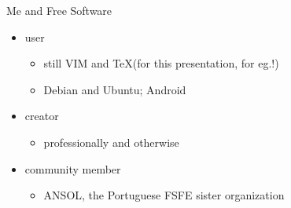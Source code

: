 \documentclass[landscape]{slides}
\begin{document}
\begin{slide}
Me and Free Software
  \begin{itemize}
    \item{} user
      \begin{itemize}
          \item{} still VIM and \TeX (for this presentation, for eg.!)
          \item{} Debian and Ubuntu; Android
      \end{itemize}
    \item{} creator
      \begin{itemize}
        \item{} professionally and otherwise
      \end{itemize}
    \item{} community member
      \begin{itemize}
        \item{} ANSOL, the Portuguese FSFE sister organization
      \end{itemize}
  \end{itemize}
\end{slide}



\begin{slide}
\end{slide}

\begin{slide}
\end{slide}
\end{document}
